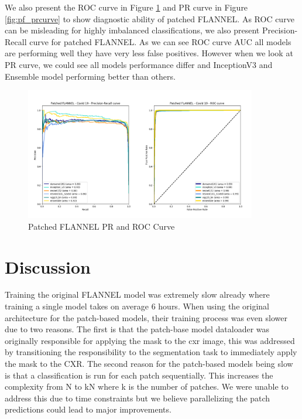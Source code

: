 \documentclass{sigkddExp}
\begin{document}
We also present the ROC curve in Figure \ref{fig:pf_roccurve} and PR curve in
Figure \ref{fig:pf_prcurve} to show diagnostic ability of patched FLANNEL.
As ROC curve can be misleading for highly imbalanced classifications, we also
present Precision-Recall curve for patched FLANNEL. As we can see ROC curve AUC
all models are performing well they have very less false positives. However when
we look at PR curve, we could see all models performance differ and InceptionV3
and Ensemble model performing better than others.


\begin{figure}[h]
    \centering
    \includegraphics[width=0.9\textwidth]{../doc/images/patched_flannel_covid_19_plot_curve.png}
    \caption{Patched FLANNEL PR and ROC Curve}
    \label{fig:pf_roccurve}
\end{figure}










\section{Discussion}

Training the original FLANNEL model was extremely slow already where training a
single model takes on average 6 hours. When using the original architecture for
the patch-based models, their training process was even slower due to two
reasons. The first is that the patch-base model dataloader was originally
responsible for applying the mask to the cxr image, this was addressed by
transitioning the responsibility to the segmentation task to immediately apply
the mask to the CXR. The second reason for the patch-based models being slow is
that a classification is run for each patch sequentially. This increases the
complexity from N to kN where k is the number of patches. We were unable to
address this due to time constraints but we believe parallelizing the patch
predictions could lead to major improvements.
\end{document}
